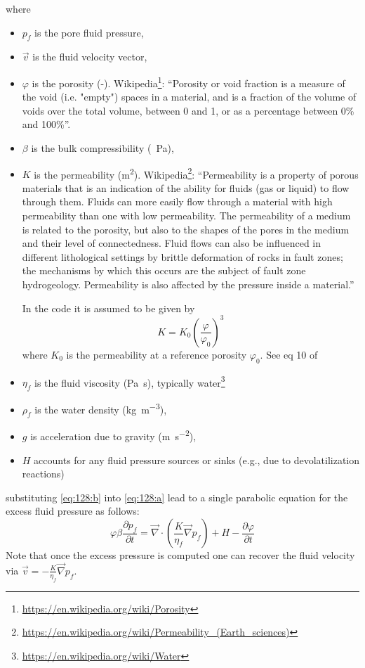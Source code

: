 \documentclass[a4paper]{article}
\begin{document}
where
\begin{itemize}
\item $p_f$ is the pore fluid pressure,
\item $\vec{v}$ is the fluid velocity vector,
\item $\varphi$ is the porosity (-). 
Wikipedia\footnote{\url{https://en.wikipedia.org/wiki/Porosity}}:
``Porosity or void fraction is a measure of the void (i.e. "empty") spaces 
in a material, and is a fraction of the volume of voids over the total volume, 
between 0 and 1, or as a percentage between 0\% and 100\%''. 

\item $\beta$ is the bulk compressibility (\si{\per\pascal}),

\item $K$ is the permeability (\si{\square\meter}). 
Wikipedia\footnote{\url{https://en.wikipedia.org/wiki/Permeability_(Earth_sciences)}}: 
``Permeability is a property of porous materials that is an indication of the ability for fluids (gas or liquid) 
to flow through them. Fluids can more easily flow through a material with high permeability than one with 
low permeability. The permeability of a medium is related to the porosity, but also to the shapes of 
the pores in the medium and their level of connectedness. Fluid flows can also be influenced in 
different lithological settings by brittle deformation of rocks in fault zones; the mechanisms by 
which this occurs are the subject of fault zone hydrogeology. Permeability is also affected by 
the pressure inside a material.''

In the code it is assumed to be given by \textcite{skre16,begu18}
\[
K = K_0 \left( \frac{\varphi}{\varphi_0}  \right)^3
\]
where $K_0$ is the permeability at a reference porosity $\varphi_0$. See eq 10 of \textcite{wanu84}

\item $\eta_f$ is the fluid viscosity (\si{\pascal\second}), typically 
water\footnote{\url{https://en.wikipedia.org/wiki/Water}}
\item $\rho_f$ is the water density (\si{\kg\per\cubic\meter}),
\item $g$ is acceleration due to gravity (\si{\meter\per\square\second}),
\item $H$ accounts for any fluid pressure sources or sinks (e.g., due to devolatilization reactions)
\end{itemize}
substituting \eqref{eq:128:b} into \eqref{eq:128:a} lead to a single parabolic equation for
the excess fluid pressure as follows:
\begin{equation}
\varphi \beta  \frac{\partial p_f}{\partial t}
=\vec\nabla \cdot \left( \frac{K}{\eta_f} \vec\nabla p_f  \right) + H
-\frac{\partial \varphi}{\partial t}
\end{equation}
Note that once the excess pressure is computed one can recover the fluid velocity via
$\vec{v}=-\frac{K}{\eta_f} \vec\nabla p_f$.
\end{document}
